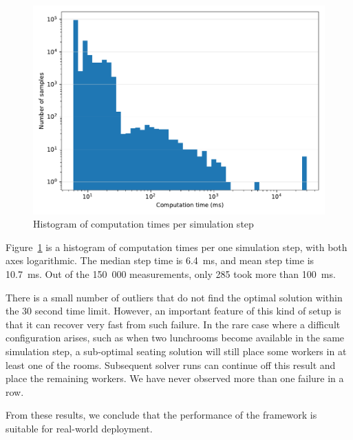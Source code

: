\begin{figure}[ht]
    \centering
    \includegraphics[width=1\linewidth]{img/simulation.pdf}
    \caption{Histogram of computation times per simulation step}
    \label{fig:simulation}
\end{figure}

Figure~\ref{fig:simulation} is a histogram of computation times per one simulation step,
with both axes logarithmic. The median step time is 6.4~ms, and mean step time is
10.7~ms. Out of the 150~000 measurements, only 285 took more than 100~ms.

There is a small number of outliers that do not find the optimal solution within the 30
second time limit. However, an important feature of this kind of setup is that it can
recover very fast from such failure. In the rare case where a difficult configuration
arises, such as when two lunchrooms become available in the same simulation step, a
sub-optimal seating solution will still place some workers in at least one of the rooms.
Subsequent solver runs can continue off this result and place the remaining workers. We
have never observed more than one failure in a row.

From these results, we conclude that the performance of the framework is suitable for
real-world deployment.
